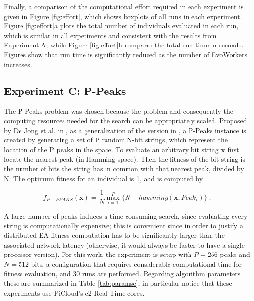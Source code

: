 Finally, a comparison of the computational effort required in each experiment is given in
Figure \ref{fig:effort}, which shows boxplots of all runs in each experiment.
Figure \ref{fig:effort}a plots the total number of individuals evaluated in each run, which is similar in all experiments
and consistent with the results from Experiment A;
while Figure \ref{fig:effort}b compares the total run time in seconds.
Figures show that run time is significantly reduced as the number of EvoWorkers increases.



\subsection{Experiment C: P-Peaks}
\label{expb}

The P-Peaks problem was chosen because the problem and consequently the computing resources needed for the search can be appropriately scaled.
Proposed by De Jong et al. in \cite{Jong:PS97}, as a generalization of the version in \cite{Jong:1990}, a
P-Peaks instance is created by generating a set of P random N-bit
strings, which represent the location of the P peaks in the space. To
evaluate an arbitrary bit string \begin{math} \mathbf{x} \end{math}
first locate the nearest peak (in Hamming space). Then the fitness of
the bit string is the number of bits the string has in common with
that nearest peak, divided by N. The optimum fitness for an individual
is 1, and is computed by

\begin{equation}
f_{P-PEAKS}(\mathbf{x})=\frac{1}{N} \overset{P}{\max_{i=1}} \{N-hamming(\mathbf{x},Peak_i)   \} \ .
\end{equation}

A large number of peaks induces a time-consuming search,
since evaluating every string is computationally expensive; this is
convenient since in order to justify a distributed EA fitness computation has to be significantly larger than the associated
network latency (otherwise, it would always be faster to have a single-processor version).
For this work, the experiment is setup with $P = 256$ peaks and $N = 512$ bits, a configuration that requires considerable computational time for
fitness evaluation, and 30 runs are performed.
Regarding algorithm parameters these are summarized in Table \ref{tab:paramse},
in particular notice that these experiments use PiCloud's c2 Real Time cores.

